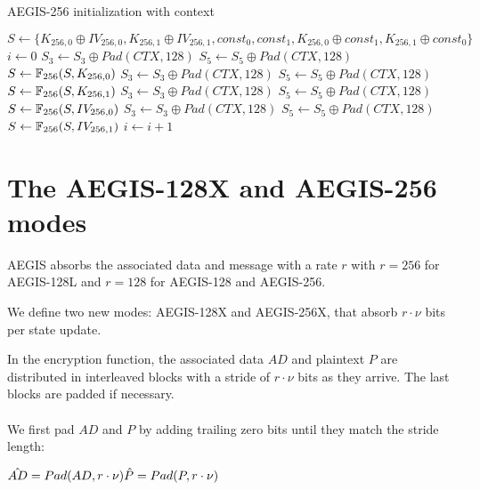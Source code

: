 \documentclass[envcountsame,runningheads,notitlepage]{llncs}
\begin{document}
\begin{algorithm}
  \caption{AEGIS-256 initialization with context}
  \label{aegis-256 initialization with context}
  \begin{algorithmic}
    \State $S \gets \{ K_{256,0} \oplus IV_{256,0}, K_{256,1} \oplus IV_{256,1}, const_0, const_1, K_{256,0} \oplus const_1, K_{256,1} \oplus const_0 \}$
    \State $i \gets 0$
    \State $S_3 \gets S_3 \oplus Pad(CTX, 128)$
    \State $S_5 \gets S_5 \oplus Pad(CTX, 128)$
    \State $S \gets \mathbb{F}_{256}(S, K_{256,0})$
    \State $S_3 \gets S_3 \oplus Pad(CTX, 128)$
    \State $S_5 \gets S_5 \oplus Pad(CTX, 128)$
    \State $S \gets \mathbb{F}_{256}(S, K_{256,1})$
    \State $S_3 \gets S_3 \oplus Pad(CTX, 128)$
    \State $S_5 \gets S_5 \oplus Pad(CTX, 128)$
    \State $S \gets \mathbb{F}_{256}(S, IV_{256,0})$
    \State $S_3 \gets S_3 \oplus Pad(CTX, 128)$
    \State $S_5 \gets S_5 \oplus Pad(CTX, 128)$
    \State $S \gets \mathbb{F}_{256}(S, IV_{256,1})$
    \State $i \gets i+1$
    \EndWhile
    \EndFunction
  \end{algorithmic}
\end{algorithm}

\section{The AEGIS-128X and AEGIS-256 modes}
\label{sec:parallel processing}

AEGIS absorbs the associated data and message with a rate $r$ with $r=256$ for AEGIS-128L and $r=128$ for AEGIS-128 and AEGIS-256.

We define two new modes: AEGIS-128X and AEGIS-256X, that absorb $r \cdot \nu$ bits per state update.

In the encryption function, the associated data $AD$ and plaintext $P$ are distributed in interleaved blocks with a stride of $r \cdot \nu$ bits as they arrive. The last blocks are padded if necessary.

\paragraph{}

We first pad $AD$ and $P$ by adding trailing zero bits until they match the stride length:

\begin{math}
  \\
  \hat{AD} = Pad(AD, r \cdot \nu) \\
  \hat{P} = Pad(P, r \cdot \nu)
\end{math}
\end{document}
